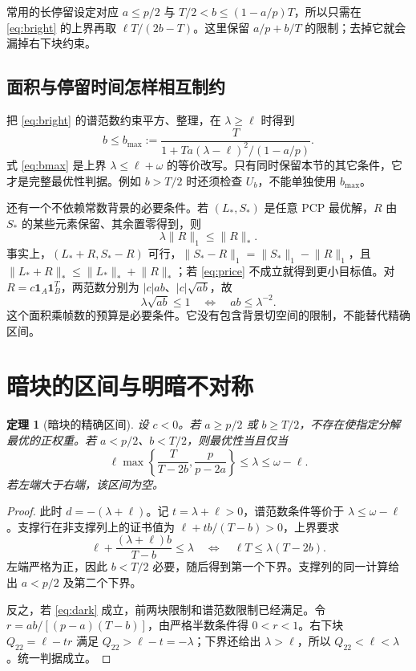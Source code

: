 \documentclass[UTF8,fontset=none,zihao=-4,a4paper]{ctexart}
\theoremstyle{plainzh}
\newtheorem{theorem}{定理}[section]
\newcommand{\one}{\bm 1}
\newcommand{\nuc}[1]{\lVert #1\rVert_*}
\newcommand{\ellone}[1]{\lVert #1\rVert_1}
\numberwithin{equation}{section}
\begin{document}
常用的长停留设定对应 $a\le p/2$ 与 $T/2<b\le(1-a/p)T$，所以只需在 \eqref{eq:bright} 的上界再取 $\ell T/(2b-T)$。这里保留 $a/p+b/T$ 的限制；去掉它就会漏掉右下块约束。

\subsection{面积与停留时间怎样相互制约}

把 \eqref{eq:bright} 的谱范数约束平方、整理，在 $\lambda\ge\ell$ 时得到
\begin{equation}\label{eq:bmax}
 b\le b_{\max}:=
 \frac{T}{1+Ta(\lambda-\ell)^2/(1-a/p)}.
\end{equation}
式 \eqref{eq:bmax} 是上界 $\lambda\le\ell+\omega$ 的等价改写。只有同时保留本节的其它条件，它才是完整最优性判据。例如 $b>T/2$ 时还须检查 $U_b$，不能单独使用 $b_{\max}$。

还有一个不依赖常数背景的必要条件。若 $(L_*,S_*)$ 是任意 PCP 最优解，$R$ 由 $S_*$ 的某些元素保留、其余置零得到，则
\begin{equation}\label{eq:price}
 \lambda\ellone R\le\nuc R.
\end{equation}
事实上，$(L_*+R,S_*-R)$ 可行，$\ellone{S_*-R}=\ellone{S_*}-\ellone R$，且 $\nuc{L_*+R}\le\nuc{L_*}+\nuc R$；若 \eqref{eq:price} 不成立就得到更小目标值。对 $R=c\one_A\one_B^T$，两范数分别为 $|c|ab$、$|c|\sqrt{ab}$，故
\begin{equation}\label{eq:budget}
 \lambda\sqrt{ab}\le1\quad\Longleftrightarrow\quad ab\le\lambda^{-2}.
\end{equation}
这个面积乘帧数的预算是必要条件。它没有包含背景切空间的限制，不能替代精确区间。

\section{暗块的区间与明暗不对称}

\begin{theorem}[暗块的精确区间]\label{thm:dark}
设 $c<0$。若 $a\ge p/2$ 或 $b\ge T/2$，不存在使指定分解最优的正权重。若 $a<p/2$、$b<T/2$，则最优性当且仅当
\begin{equation}\label{eq:dark}
 \boxed{\quad
 \ell\max\left\{\frac{T}{T-2b},\frac{p}{p-2a}\right\}
 \le\lambda\le\omega-\ell.
 \quad}
\end{equation}
若左端大于右端，该区间为空。
\end{theorem}
\begin{proof}
此时 $d=-(\lambda+\ell)$。记 $t=\lambda+\ell>0$，谱范数条件等价于 $\lambda\le\omega-\ell$。支撑行在非支撑列上的证书值为 $\ell+tb/(T-b)>0$，上界要求
\[
 \ell+\frac{(\lambda+\ell)b}{T-b}\le\lambda
 \quad\Longleftrightarrow\quad
 \ell T\le\lambda(T-2b).
\]
左端严格为正，因此 $b<T/2$ 必要，随后得到第一个下界。支撑列的同一计算给出 $a<p/2$ 及第二个下界。

反之，若 \eqref{eq:dark} 成立，前两块限制和谱范数限制已经满足。令 $r=ab/[(p-a)(T-b)]$，由严格半数条件得 $0<r<1$。右下块 $Q_{22}=\ell-tr$ 满足 $Q_{22}>\ell-t=-\lambda$；下界还给出 $\lambda>\ell$，所以 $Q_{22}<\ell<\lambda$。统一判据成立。
\end{proof}
\end{document}
